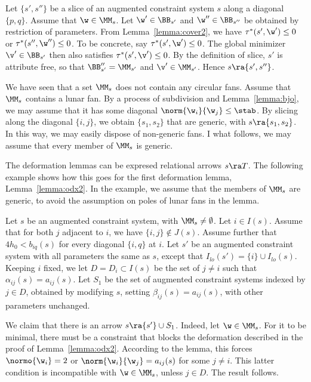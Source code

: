\begin{example}[slice]  Let $\{s',s''\}$ be a slice of
an augmented constraint system $s$ along
a diagonal $\{p,q\}$.  Assume that $\w\in\MM_s$.
Let $\w'\in \BB_{s'}$ and $\w''\in \BB_{s''}$ be obtained
by restriction of parameters.  From Lemma~\ref{lemma:cover2},
we have $\tau^*(s',\w')\le 0$ or $\tau^*(s'',\w'')\le0$.  To be
concrete, say $\tau^*(s',\w')\le 0$.  The global minimizer
$\v'\in\BB_{s'}$
then also satisfies $\tau^*(s',\v')\le 0$.  By the definition of
slice, $s'$ is attribute free, so that $\BB''_{s'}=\MM_{s'}$ and
$\v'\in \MM_{s'}$.  Hence $s\ra\{s',s''\}$.
\end{example}

\begin{remark}
We have seen that a set $\MM_s$ does not contain any circular fans.
Assume that $\MM_s$ contains a lunar fan.
By a process of subdivision and Lemma~\ref{lemma:bjo}, we may assume
that it has some diagonal $\norm{\w_i}{\w_j}\le\stab$.  By slicing
along
the diagonal $\{i,j\}$, we obtain $\{s_1,s_2\}$ that are generic, with
$s\ra\{s_1,s_2\}$.  In this way, we may easily dispose of non-generic
fans.  I what follows, we may assume that every member of $\MM_s$ is
generic.
\end{remark}

The deformation lemmas can be expresed relational
arrows $s\ra T$.  The following example shows how this goes
for the first deformation lemma, Lemma~\ref{lemma:odx2}.  
In the example, we assume
that the members of $\MM_s$ are generic, to avoid the assumption
on poles of lunar fans in the lemma.

\begin{example}[deformation]  
Let $s$ be an augmented constraint
  system, with $\MM_s\ne\emptyset$.  Let $i\in I(s)$.
Assume that for both $j$ adjacent to $i$, we have $\{i,j\}\not\in
J(s)$.
Assume further that $4h_0 < b_{iq}(s)$ for every diagonal $\{i,q\}$ at
$i$.  Let $s'$ be an augmented constraint system with all parameters
the same as $s$, except that $I_{lo}(s') = \{i\}\cup I_{lo}(s)$.
Keeping $i$ fixed, we
let $D=D_i\subset I(s)$ be the set of $j\ne i$ such that 
$\alpha_{ij}(s)=a_{ij}(s)$. 
Let $S_1$ be the set of augmented constraint systems indexed by $j\in
D$,
obtained by
modifying $s$, setting $\beta_{ij}(s)=a_{ij}(s)$, with other
parameters unchanged.

We claim that there is an arrow $s\ra \{s'\}\cup S_1$.  Indeed, let
$\w\in \MM_s$.  For it to be minimal, there must be a constraint
that blocks the  deformation described in the proof of
Lemma~\ref{lemma:odx2}.
According to the lemma, this forces $\normo{\w_i}=2$ or
$\norm{\w_i}{\w_j}=a_{ij}(s)$ for some $j\ne i$.  This latter
condition
is incompatible with $\w\in \MM_s$, unless $j\in D$.  The result
follows.
\end{example}


